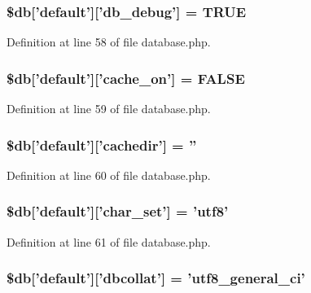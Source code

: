 \subsubsection[{\$db}]{\setlength{\rightskip}{0pt plus 5cm}\$db['default']['db\-\_\-debug'] = T\-R\-U\-E}\label{development_2database_8php_aa79c6a73d78063a2b2ee6903a9851908}


Definition at line 58 of file database.\-php.

\subsubsection[{\$db}]{\setlength{\rightskip}{0pt plus 5cm}\$db['default']['cache\-\_\-on'] = F\-A\-L\-S\-E}\label{development_2database_8php_a05a82adb11460f351c1df4ae9be71866}


Definition at line 59 of file database.\-php.

\subsubsection[{\$db}]{\setlength{\rightskip}{0pt plus 5cm}\$db['default']['cachedir'] = ''}\label{development_2database_8php_a12683252490249e3294aebaca97c4126}


Definition at line 60 of file database.\-php.

\subsubsection[{\$db}]{\setlength{\rightskip}{0pt plus 5cm}\$db['default']['char\-\_\-set'] = 'utf8'}\label{development_2database_8php_a581bc2f1f3fa806239c44e2c2293dc59}


Definition at line 61 of file database.\-php.

\subsubsection[{\$db}]{\setlength{\rightskip}{0pt plus 5cm}\$db['default']['dbcollat'] = 'utf8\-\_\-general\-\_\-ci'}\label{development_2database_8php_ab03697bf8340acfa74bf20c952aa81c7}


